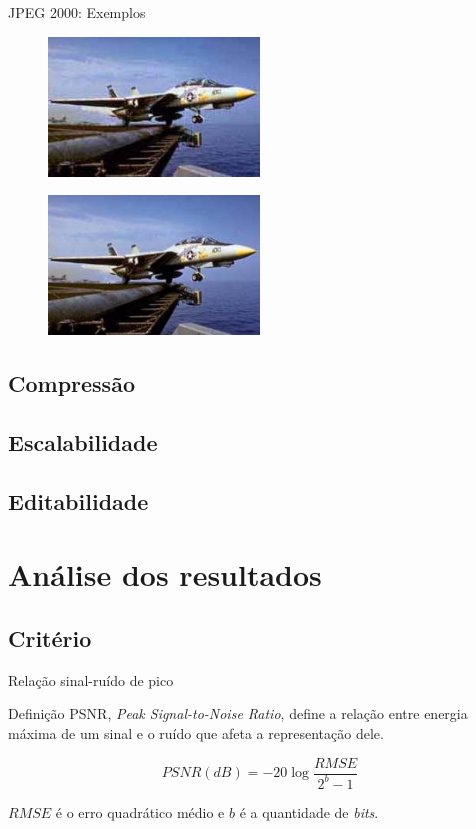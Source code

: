 \documentclass{beamer}
\begin{document}
\begin{frame}{JPEG 2000: Exemplos}
   \begin{multicols}{2}
      \begin{figure}[h]
         \includegraphics[width=0.5\textwidth]{figure/ex_jpeg_02_1.jpg}
      \end{figure}
      \begin{figure}[h]
         \includegraphics[width=0.5\textwidth]{figure/ex_jpeg2k_02_2.jpg}
      \end{figure}
   \end{multicols}
\end{frame}

\subsection{Compressão}
\subsection{Escalabilidade}
\subsection{Editabilidade}
\section{Análise dos resultados}
\subsection{Critério}
\begin{frame}{Relação sinal-ruído de pico}
   \begin{block}{Definição}
      PSNR, \emph{Peak Signal-to-Noise Ratio}, define a relação entre energia máxima de um sinal e o ruído que afeta a representação dele.

      $$ PSNR(dB) = -20 \log \frac{RMSE}{2^b -1} $$

      $RMSE$ é o erro quadrático médio e $b$ é a quantidade de \emph{bits}.
   \end{block}
\end{frame}
\end{document}
